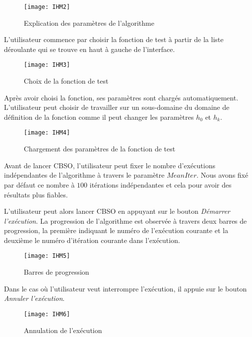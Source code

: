 \begin{figure}[H]
	\centering
	\texttt{[image: IHM2]}
	\caption{Explication des paramètres de l'algorithme}
\end{figure}

\bigskip \bigskip \bigskip 

L'utilisateur commence  par choisir la fonction de test à partir de la liste déroulante qui se trouve en haut à gauche de l'interface.

\begin{figure}[H]
	\centering
	\texttt{[image: IHM3]}
	\caption{Choix de la fonction de test}
\end{figure}
\vspace{-2em}
Après avoir choisi la fonction, ses paramètres sont chargés automatiquement. L'utilisateur peut choisir de travailler sur un sous-domaine du domaine de définition de la fonction comme il peut changer les paramètres $h_0$ et $h_k$.

\begin{figure}[H]
	\centering
	\texttt{[image: IHM4]}
	\caption{Chargement des paramètres de la fonction de test}
\end{figure}
\vspace{-2em}
Avant de lancer CBSO, l'utilisateur peut fixer le nombre d'exécutions indépendantes de l'algorithme à travers le paramètre $MeanIter$. Nous avons fixé par défaut ce nombre à $100$ itérations indépendantes et cela pour avoir des résultats plus fiables.

L'utilisateur peut alors lancer CBSO en appuyant sur le bouton \emph{Démarrer l'exécution}. La progression de l'algorithme est observée à travers deux barres de progression, la première indiquant le numéro de l'exécution courante et la deuxième le numéro d'itération courante dans l'exécution.


\begin{figure}[H]
	\centering
	\texttt{[image: IHM5]}
	\caption{Barres de progression}
\end{figure}

Dans le cas où l'utilisateur veut interrompre l'exécution, il appuie sur le bouton \emph{Annuler l'exécution}.
\begin{figure}[H]
	\centering
	\texttt{[image: IHM6]}
	\caption{Annulation de l'exécution}
\end{figure}

